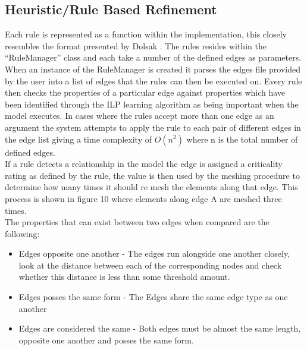 \subsection{Heuristic/Rule Based Refinement}
Each rule is represented as a function within the implementation, this closely resembles the format presented by Dolsak \cite{DolsakPaper91, DolsakPaper94, appOfILPToFEMeshDesign, ConsultRuleIntellSystemFE}. The rules resides within the ``RuleManager'' class and each take a number of the defined edges as parameters. When an instance of the RuleManager is created it parses the edges file provided by the user into a list of edges that the rules can then be executed on. Every rule then checks the properties of a particular edge against properties which have been identified through the ILP learning algorithm as being important when the model executes. In cases where the rules accept more than one edge as an argument the system attempts to apply the rule to each pair of different edges in the edge list giving a time complexity of $O(n^2)$ where n is the total number of defined edges.\\

\noindent
If a rule detects a relationship in the model the edge is assigned a criticality rating as defined by the rule, the value is then used by the meshing procedure to determine how many times it should re mesh the elements along that edge. This process is shown in figure 10 where elements along edge A are meshed three times.\\ 
 
\noindent
The properties that can exist between two edges when compared are the following:
\begin{itemize}
\item Edges opposite one another - The edges run alongside one another closely, look at the distance between each of the corresponding nodes and check whether this distance is less than some threshold amount.

\item Edges posses the same form - The Edges share the same edge type as one another

\item Edges are considered the same - Both edges must be almost the same length, opposite one another and posses the same form.
\end{itemize}

